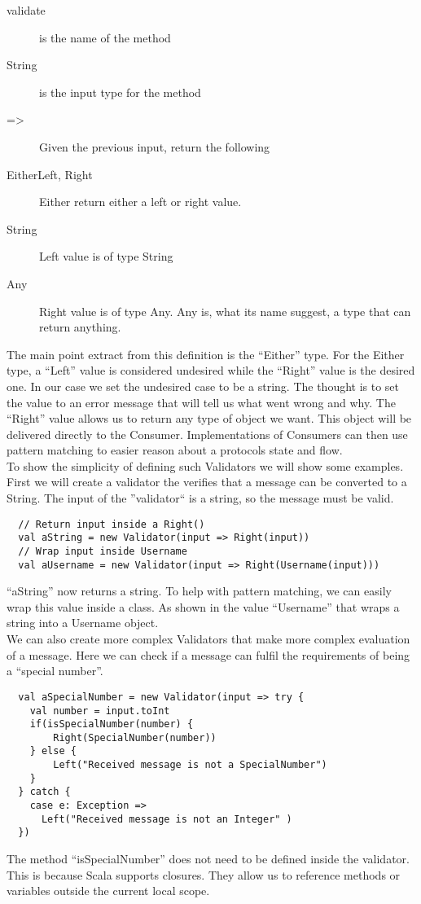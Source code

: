 \begin{description}
 \item[validate] is the name of the method
 \item[String] is the input type for the method
 \item[=>] Given the previous input, return the following
 \item[Either\lbrack Left, Right\rbrack] Either return either a left or right value.
 \item[String] Left value is of type String
 \item[Any] Right value is of type Any. Any is, what its name suggest, a type that can return anything.
\end{description}
The main point extract from this definition is the ``Either'' type. For the Either type, a ``Left'' value is considered undesired while the ``Right'' value is the desired one. In our case we set the undesired case to be a string. The thought is to set the value to an error message that will tell us what went wrong and why. The ``Right'' value allows us to return any type of object we want. This object will be delivered directly to the Consumer. Implementations of Consumers can then use pattern matching to easier reason about a protocols state and flow.
\\
To show the simplicity of defining such Validators we will show some examples. First we will create a validator the verifies that a message can be converted to a String. The input of the ''validator`` is a string, so the message must be valid.
\begin{lstlisting}
  // Return input inside a Right()
  val aString = new Validator(input => Right(input))
  // Wrap input inside Username
  val aUsername = new Validator(input => Right(Username(input)))
\end{lstlisting}
``aString'' now returns a string. To help with pattern matching, we can easily wrap this value inside a class. As shown in the value ``Username'' that wraps a string into a Username object.
\\
We can also create more complex Validators that make more complex evaluation of a message. Here we can check if a message can fulfil the requirements of being a ``special number''.
\begin{lstlisting}
  val aSpecialNumber = new Validator(input => try {
    val number = input.toInt
    if(isSpecialNumber(number) {
        Right(SpecialNumber(number))
    } else {
        Left("Received message is not a SpecialNumber") 
    }
  } catch {
    case e: Exception =>
      Left("Received message is not an Integer" )
  })
\end{lstlisting}
The method ``isSpecialNumber'' does not need to be defined inside the validator. This is because Scala supports closures. They allow us to reference methods or variables outside the current local scope.
%

